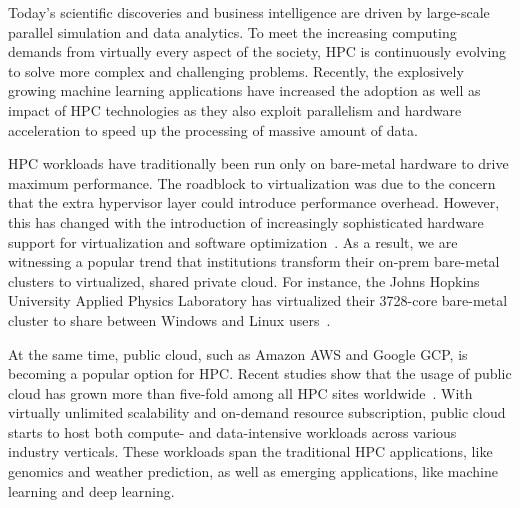 Today's scientific discoveries and business intelligence are driven by large-scale parallel simulation and data analytics. To meet the increasing computing demands from 
virtually every aspect of the society, HPC is continuously evolving to solve more 
complex and challenging problems. 
Recently, the explosively growing machine learning applications have increased the adoption as well as 
impact of HPC technologies as they also exploit parallelism and hardware acceleration to speed up the processing of 
massive amount of data.


HPC workloads have traditionally been run only on bare-metal hardware to drive maximum 
performance. 
The roadblock to virtualization was due to the concern that the extra hypervisor layer could introduce 
performance overhead. 
However, this has changed with the introduction of increasingly sophisticated 
hardware support for virtualization and software optimization~\cite{mergen2006virtualization}. %
As a result, we are witnessing a popular trend that institutions transform 
their on-prem bare-metal clusters to virtualized, shared private cloud. For instance, the Johns Hopkins 
University Applied Physics Laboratory has virtualized their 3728-core bare-metal cluster 
to share between Windows and Linux users~\cite{vmware2017josh}. %

At the same time, public cloud, such as Amazon AWS and Google GCP, is becoming a popular option for 
HPC. Recent studies show that the usage of public cloud has grown more than five-fold among all HPC 
sites worldwide~\cite{hyperion2019}.
With virtually unlimited scalability and on-demand resource subscription, public cloud starts to host 
both compute- and data-intensive workloads across various industry verticals. These workloads span the traditional HPC 
applications, like genomics and 
weather prediction, as well as emerging applications, like machine learning and deep learning. 


